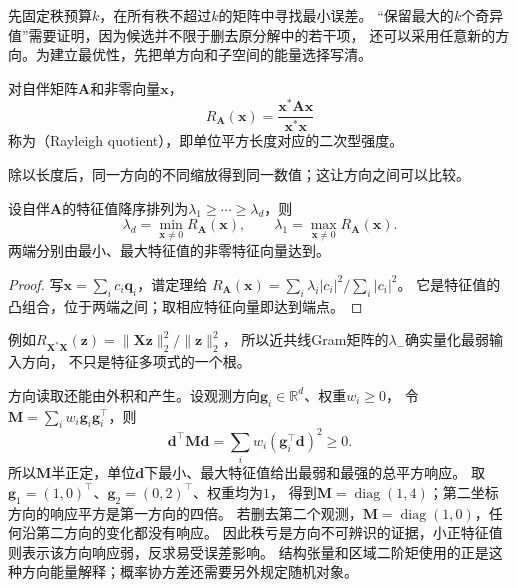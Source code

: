 先固定秩预算$k$，在所有秩不超过$k$的矩阵中寻找最小误差。
“保留最大的$k$个奇异值”需要证明，因为候选并不限于删去原分解中的若干项，
还可以采用任意新的方向。为建立最优性，先把单方向和子空间的能量选择写清。

\begin{definition}[Rayleigh商]
\label{def:matrix-analysis-rayleigh-quotient}
对自伴矩阵$\bm A$和非零向量$\bm x$，
\begin{equation}
 R_{\bm A}(\bm x)=\frac{\bm x^*\bm A\bm x}{\bm x^*\bm x}
 \label{eq:matrix-analysis-rayleigh-quotient}
\end{equation}
称为（Rayleigh quotient），即单位平方长度对应的二次型强度。
\end{definition}
除以长度后，同一方向的不同缩放得到同一数值；这让方向之间可以比较。
\begin{theorem}
\label{thm:matrix-analysis-rayleigh-ritz}
设自伴$\bm A$的特征值降序排列为$\lambda_1\geq\cdots\geq\lambda_d$，则
\begin{equation}
 \lambda_d=\min_{\bm x\neq0}R_{\bm A}(\bm x),\qquad
 \lambda_1=\max_{\bm x\neq0}R_{\bm A}(\bm x).
 \label{eq:matrix-analysis-rayleigh-ritz}
\end{equation}
两端分别由最小、最大特征值的非零特征向量达到。
\end{theorem}
\begin{proof}
写$\bm x=\sum_i c_i\bm q_i$，谱定理给
$R_{\bm A}(\bm x)=\sum_i\lambda_i|c_i|^2/\sum_i|c_i|^2$。
它是特征值的凸组合，位于两端之间；取相应特征向量即达到端点。
\end{proof}
例如$R_{\bm X^*\bm X}(\bm z)=
\lVert\bm X\bm z\rVert_2^2/\lVert\bm z\rVert_2^2$，
所以近共线Gram矩阵的$\lambda_-$确实量化最弱输入方向，
不只是特征多项式的一个根。

方向读取还能由外积和产生。设观测方向$\bm g_i\in\mathbb R^d$、权重$w_i\geq0$，
令$\bm M=\sum_i w_i\bm g_i\bm g_i^\top$，则
\[
 \bm d^\top\bm M\bm d=\sum_i w_i(\bm g_i^\top\bm d)^2\geq0.
\]
所以$\bm M$半正定，单位$\bm d$下最小、最大特征值给出最弱和最强的总平方响应。
取$\bm g_1=(1,0)^\top$、$\bm g_2=(0,2)^\top$、权重均为$1$，
得到$\bm M=\operatorname{diag}(1,4)$；第二坐标方向的响应平方是第一方向的四倍。
若删去第二个观测，$\bm M=\operatorname{diag}(1,0)$，任何沿第二方向的变化都没有响应。
因此秩亏是方向不可辨识的证据，小正特征值则表示该方向响应弱，反求易受误差影响。
结构张量和区域二阶矩使用的正是这种方向能量解释；概率协方差还需要另外规定随机对象。

